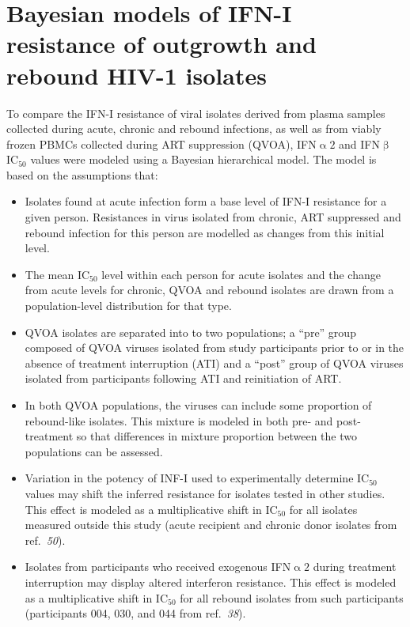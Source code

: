 \documentclass[12pt]{article}
\newcommand{\ifna}{IFN\hspace{-.08em}${\upalpha 2}$}
\newcommand{\ifnb}{IFN\hspace{-.03em}${\upbeta}$}
\newcommand{\icFifty}{IC$_{50}$}
\newcommand{\iyerRef}{\textit{50}}
\newcommand{\azzRef}{\textit{38}}
\begin{document}
\section*{Bayesian models of IFN-I resistance of outgrowth and rebound HIV-1 isolates}
  To compare the IFN-I resistance of viral isolates derived from plasma samples collected during acute, chronic and rebound infections, as well as from viably frozen PBMCs collected during ART suppression (QVOA), \ifna{} and \ifnb{} \icFifty{} values were modeled using a Bayesian hierarchical model. The model is based on the assumptions that:
  \begin{itemize}
    \item Isolates found at acute infection form a base level of IFN-I resistance for a given person.  Resistances in virus isolated from chronic, ART suppressed and rebound infection for this person are modelled as changes from this initial level.
    \item The mean \icFifty{} level within each person for acute isolates and the change from acute levels for chronic, QVOA and rebound isolates are drawn from a population-level distribution for that type. 
    \item QVOA isolates are separated into to two populations; a ``pre'' group composed of QVOA viruses isolated from study participants prior to or in the absence of treatment interruption (ATI) and a ``post'' group of QVOA viruses isolated from participants following ATI and reinitiation of ART.
    \item In both QVOA populations, the viruses can include some proportion of rebound-like isolates. This mixture is modeled in both pre- and post-treatment so that differences in mixture proportion between the two populations can be assessed.
    \item Variation in the potency of INF-I used to experimentally determine \icFifty{} values may shift the inferred resistance for isolates tested in other studies. This effect is modeled as a multiplicative shift in \icFifty{} for all isolates measured outside this study (acute recipient and chronic donor isolates from ref.\ \iyerRef{}).
    \item Isolates from participants who received exogenous \ifna{} during treatment interruption may display altered interferon resistance. This effect is modeled as a multiplicative shift in \icFifty{} for all rebound isolates from such participants (participants 004, 030, and 044 from ref.\ \azzRef{}).
  \end{itemize}
\end{document}
